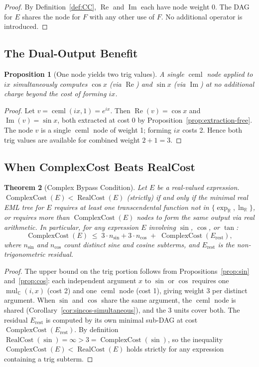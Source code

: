 \documentclass[12pt,a4paper]{article}
\newtheorem{theorem}{Theorem}[section]
\newtheorem{proposition}[theorem]{Proposition}
\theoremstyle{definition}
\newcommand{\ceml}{\operatorname{ceml}}
\newcommand{\RC}{\operatorname{RealCost}}
\newcommand{\CC}{\operatorname{ComplexCost}}
\begin{document}
\begin{proof}
By Definition~\ref{def:CC}, $\operatorname{Re}$ and $\operatorname{Im}$ each
have node weight 0.
The DAG for $E$ shares the node for $F$ with any other use of $F$.
No additional operator is introduced.
\end{proof}

\subsection{The Dual-Output Benefit}

\begin{proposition}[One node yields two trig values]
\label{prop:dual-output}
A single $\ceml$ node applied to $ix$ simultaneously computes $\cos x$
(via $\operatorname{Re}$) and $\sin x$ (via $\operatorname{Im}$) at no
additional charge beyond the cost of forming $ix$.
\end{proposition}

\begin{proof}
Let $v = \ceml(ix, 1) = e^{ix}$.
Then $\operatorname{Re}(v) = \cos x$ and $\operatorname{Im}(v) = \sin x$,
both extracted at cost 0 by Proposition~\ref{prop:extraction-free}.
The node $v$ is a single $\ceml$ node of weight 1; forming $ix$ costs 2.
Hence both trig values are available for combined weight $2 + 1 = 3$.
\end{proof}

\subsection{When ComplexCost Beats RealCost}

\begin{theorem}[Complex Bypass Condition]
\label{thm:bypass}
Let $E$ be a real-valued expression.
$\CC(E) < \RC(E)$ (strictly) if and only if the minimal real EML tree for $E$
requires at least one transcendental function not in
$\{\exp_{\mathbb{R}}, \ln_{\mathbb{R}}\}$, or requires more than
$\CC(E)$ nodes to form the same output via real arithmetic.
In particular, for any expression $E$ involving $\sin$, $\cos$, or $\tan$:
\[
  \CC(E) \;\leq\; 3 \cdot n_{\sin} + 3 \cdot n_{\cos}
                  \;+\; \CC(E_{\mathrm{rest}}),
\]
where $n_{\sin}$ and $n_{\cos}$ count distinct sine and cosine subterms, and
$E_{\mathrm{rest}}$ is the non-trigonometric residual.
\end{theorem}

\begin{proof}
The upper bound on the trig portion follows from
Propositions~\ref{prop:sin} and~\ref{prop:cos}: each independent argument $x$
to $\sin$ or $\cos$ requires one $\operatorname{mul}_{\mathbb{C}}(i, x)$ (cost 2)
and one $\ceml$ node (cost 1), giving weight 3 per distinct argument.
When $\sin$ and $\cos$ share the same argument, the $\ceml$ node is shared
(Corollary~\ref{cor:sincos-simultaneous}), and the 3 units cover both.
The residual $E_{\mathrm{rest}}$ is computed by its own minimal sub-DAG at
cost $\CC(E_{\mathrm{rest}})$.
By definition $\RC(\sin) = \infty > 3 = \CC(\sin)$, so the inequality
$\CC(E) < \RC(E)$ holds strictly for any expression containing a trig subterm.
\end{proof}
\end{document}
